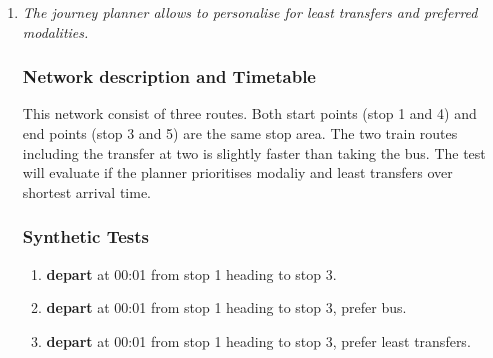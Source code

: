 \documentclass[a4paper,11pt]{article}
\begin{document}
\begin{enumerate}

\item \textit{The journey planner allows to personalise for least transfers and preferred modalities.}

\subsubsection*{Network description and Timetable}
This network consist of three routes.
Both start points (stop 1 and 4) and end points (stop 3 and 5) are the same stop area.
The two train routes including the transfer at two is slightly faster than taking the bus.
The test will evaluate if the planner prioritises modaliy and least transfers over shortest arrival time.

\begin{figure}[h]
\vspace{1em}
\raggedleft
\begin{minipage}{245pt}
\end{minipage}
\label{fig:singlemodality_network}
\vspace{-2em}
\end{figure}

\subsubsection*{Synthetic Tests}
\begin{enumerate}
\item \textbf{depart} at 00:01 from stop 1 heading to stop 3.
\item \textbf{depart} at 00:01 from stop 1 heading to stop 3, prefer bus.
\item \textbf{depart} at 00:01 from stop 1 heading to stop 3, prefer least transfers.
\end{enumerate}


\end{enumerate}
\end{document}
